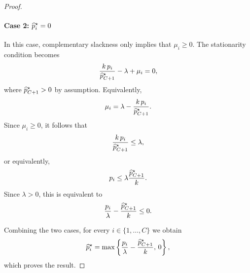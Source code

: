 \begin{proof}
    \paragraph{Case 2: $\widehat{p}_i^\star=0$}
    In this case, complementary slackness only implies that $\mu_i\ge0$. The stationarity condition becomes
    \begin{align*}
        \frac{k\,p_i}{\widehat{p}_{C+1}^\star}-\lambda+\mu_i=0,
    \end{align*}
    where $\widehat{p}_{C+1}^\star>0$ by assumption. Equivalently,
    \begin{align*}
        \mu_i = \lambda-\frac{k\,p_i}{\widehat{p}_{C+1}^\star}.
    \end{align*}
    Since $\mu_i\ge0$, it follows that
    \begin{align*}
        \frac{k\,p_i}{\widehat{p}_{C+1}^\star}\le\lambda,
    \end{align*}
    or equivalently,
    \begin{align*}
        p_i\le\lambda\frac{\widehat{p}_{C+1}^\star}{k}.
    \end{align*}
    Since $\lambda>0$, this is equivalent to
    \begin{align*}
        \frac{p_i}{\lambda}-\frac{\widehat{p}_{C+1}^\star}{k}\le0.
    \end{align*}

    Combining the two cases, for every $i\in\{1,\ldots,C\}$ we obtain
    \begin{align*}
        \widehat{p}_i^\star = \max\left\{\frac{p_i}{\lambda}-\frac{\widehat{p}_{C+1}^\star}{k}, \,0\right\},
    \end{align*}
    which proves the result.
\end{proof}

